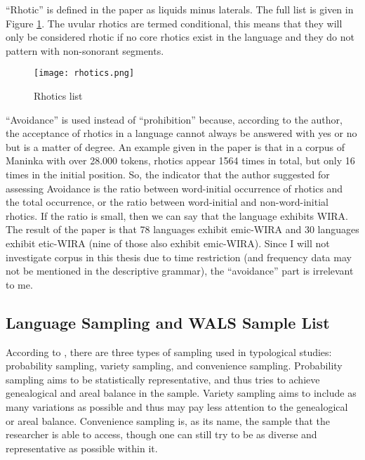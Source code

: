 \par
``Rhotic'' is defined in the paper as liquids minus laterals. The full list is given in Figure \ref{fig:rhotics}. 
The uvular rhotics are termed conditional, this means that they will only be considered rhotic if no core rhotics exist in the language and they do not pattern with non-sonorant segments.

\begin{figure}[h]
    \centering
    \texttt{[image: rhotics.png]}
    \caption{Rhotics list \citep[p.~4]{labrune2021word}}
    \label{fig:rhotics}
\end{figure}

``Avoidance'' is used instead of ``prohibition'' because, according to the author, the acceptance of rhotics in a language cannot always be answered with yes or no but is a matter of degree. An example given in the paper is that in a corpus of Maninka with over 28.000 tokens, rhotics appear 1564 times in total, but only 16 times in the initial position. So, the indicator that the author suggested for assessing Avoidance is the ratio between word-initial occurrence of rhotics and the total occurrence, or the ratio between word-initial and non-word-initial rhotics. If the ratio is small, then we can say that the language exhibits WIRA.
The result of the paper is that 78 languages exhibit emic-WIRA and 30 languages exhibit etic-WIRA (nine of those also exhibit emic-WIRA). Since I will not investigate corpus in this thesis due to time restriction (and frequency data may not be mentioned in the descriptive grammar), the ``avoidance'' part is irrelevant to me.

\subsection{Language Sampling and WALS Sample List}

According to \citet{velupillai2012introduction}, there are three types of sampling used in typological studies: probability sampling, variety sampling, and convenience sampling. Probability sampling aims to be statistically representative, and thus tries to achieve genealogical and areal balance in the sample. Variety sampling aims to include as many variations as possible and thus may pay less attention to the genealogical or areal balance. Convenience sampling is, as its name, the sample that the researcher is able to access, though one can still try to be as diverse and representative as possible within it.

